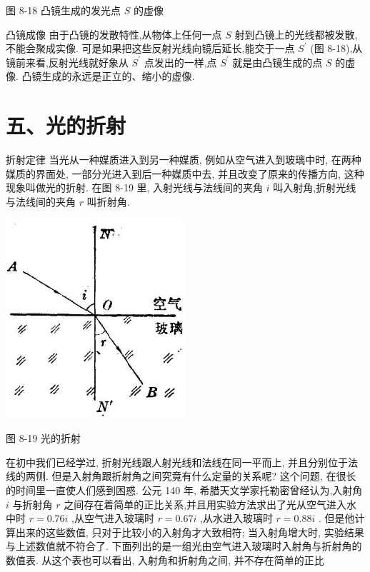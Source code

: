 \documentclass[10pt]{article}
\begin{document}
图 8-18 凸镜生成的发光点 \(S\) 的虚像

凸镜成像 由于凸镜的发散特性,从物体上任何一点 \(S\) 射到凸镜上的光线都被发散, 不能会聚成实像. 可是如果把这些反射光线向镜后延长,能交于一点 \({S}^{\prime }\) (图 8-18),从镜前来看,反射光线就好象从 \({S}^{\prime }\) 点发出的一样,点 \({S}^{\prime }\) 就是由凸镜生成的点 \(S\) 的虚像. 凸镜生成的永远是正立的、缩小的虚像.

\section*{五、光的折射}

折射定律 当光从一种媒质进入到另一种媒质, 例如从空气进入到玻璃中时, 在两种媒质的界面处, 一部分光进入到后一种媒质中去, 并且改变了原来的传播方向, 这种现象叫做光的折射. 在图 8-19 里, 入射光线与法线间的夹角 \(i\) 叫入射角,折射光线与法线间的夹角 \(r\) 叫折射角.

\begin{center}
\includegraphics[max width=0.5\textwidth]{images/01913056-1f15-74d8-9184-9aab52c9d66b_257_737415.jpg}
\end{center}

图 8-19 光的折射

在初中我们已经学过, 折射光线跟人射光线和法线在同一平而上, 并且分别位于法线的两侧. 但是入射角跟折射角之间究竟有什么定量的关系呢? 这个问题, 在很长的时间里一直使人们感到困惑. 公元 140 年, 希腊天文学家托勒密曾经认为,入射角 \(i\) 与折射角 \(r\) 之间存在着简单的正比关系,并且用实验方法求出了光从空气进入水中时 \(r = {0.76i}\) ,从空气进入玻璃时 \(r = {0.67i}\) ,从水进入玻璃时 \(r = {0.88i}\) . 但是他计算出来的这些数值, 只对于比较小的入射角才大致相符; 当入射角增大时, 实验结果与上述数值就不符合了. 下面列出的是一组光由空气进入玻璃时入射角与折射角的数值表. 从这个表也可以看出, 入射角和折射角之间, 并不存在简单的正比
\end{document}
